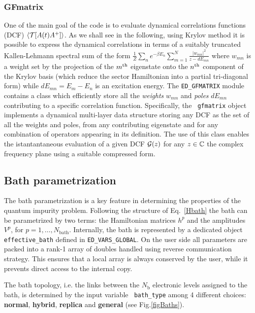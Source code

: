 \documentclass[edipack2.tex]{subfiles}
\begin{document}
\subsubsection{GFmatrix}
One of the main goal of the code is to evaluate dynamical correlations
functions (DCF) $\langle {\cal T}[ A(t) A^+ ]\rangle$. As we shall see in the following, using Krylov method it is
possible to express the dynamical correlations in terms of a suitably
truncated Kallen-Lehmann spectral sum of the form
$\tfrac{1}{Z}\sum_n e^{-\beta E_n} \sum_{m=1}^{N} \tfrac{|w_{mn}|^2}{ z
  - dE_{mn}}$ where $w_{mn}$ is a weight set by the 
projection of the $m^{\rm th}$ eigenstate onto the $n^{\rm th}$
component of the Krylov basis (which reduce the sector Hamiltonian
into a partial tri-diagonal form) while $dE_{mn}=E_m-E_n$ is an excitation energy. 
The {\tt ED\_GFMATRIX} module contains a class which efficiently store all
the {\it weights} $w_{mn}$ and {\it poles} $dE_{mn}$ contributing to
a specific correlation function. Specifically, the {\tt
  gfmatrix} object implements a dynamical multi-layer data structure
storing any DCF as the set of all the weights and poles,
from any contributing eigenstate  and for any
combination of operators appearing in its definition.
The use of this class enables the istantantaneous evaluation of a
given  DCF  ${\cal G}(z)$ for any $z\in\mathbb{C}$ the complex frequency plane
using a suitable compressed form. 
  
\subsection{Bath parametrization}\label{sSecBath}
The bath parametrization is a key feature in determining the properties
of the quantum impurity problem.
Following the structure of Eq.~\ref{Hbath} the bath can be
parametrized by two terms: the Hamiltonian matrices $h^p$ and the
amplitudes $V^p$, for $p=1,\dots,N_\mathrm{bath}$.
Internally, the bath is represented by a dedicated object {\tt
  effective\_bath} defined in {\tt ED\_VARS\_GLOBAL}. 
On the
user side all parameters are packed into a rank-1 array of
doubles handled using reverse communication strategy.
This ensures that a local array is always conserved by the user, while
it prevents direct access to the internal copy.


The bath topology, i.e. the links between the $N_\mathrm{b}$ electronic levels
assigned to the bath, is determined by the input variable {\tt
  bath\_type} among 4 different choices: {\bf normal}, {\bf hybrid},
{\bf replica} and {\bf general} (see Fig.\ref{figBaths}).  
%
\end{document}
